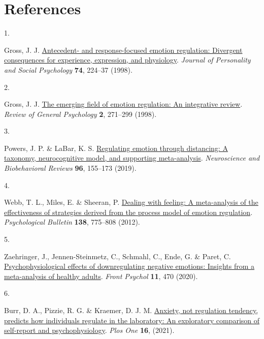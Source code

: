 \documentclass[
  man,floatsintext]{apa6}
\newlength{\cslhangindent}
\newlength{\csllabelwidth}
\newlength{\cslentryspacingunit} %
\newenvironment{CSLReferences}[2] %
 {%
  \setlength{\parindent}{0pt}
  \ifodd #1
  \let\oldpar\par
  \def\par{\hangindent=\cslhangindent\oldpar}
  \fi
  \setlength{\parskip}{#2\cslentryspacingunit}
 }%
 {}
\newcommand{\CSLLeftMargin}[1]{\parbox[t]{\csllabelwidth}{#1}}
\newcommand{\CSLRightInline}[1]{\parbox[t]{\linewidth - \csllabelwidth}{#1}\break}
\begin{document}
\hypertarget{references}{%
\section{References}\label{references}}

\begingroup
\setlength{\parindent}{-0.5in}
\setlength{\leftskip}{0.5in}

\hypertarget{refs}{}
\begin{CSLReferences}{0}{0}
\leavevmode{}%
\CSLLeftMargin{1. }%
\CSLRightInline{Gross, J. J. \href{https://doi.org/10.1037/0022-3514.74.1.224}{Antecedent- and response-focused emotion regulation: Divergent consequences for experience, expression, and physiology}. \emph{Journal of Personality and Social Psychology} \textbf{74}, 224--37 (1998).}

\leavevmode{}%
\CSLLeftMargin{2. }%
\CSLRightInline{Gross, J. J. \href{https://doi.org/10.1037/1089-2680.2.3.271}{The emerging field of emotion regulation: An integrative review}. \emph{Review of General Psychology} \textbf{2}, 271--299 (1998).}

\leavevmode{}%
\CSLLeftMargin{3. }%
\CSLRightInline{Powers, J. P. \& LaBar, K. S. \href{https://doi.org/10.1016/j.neubiorev.2018.04.023}{Regulating emotion through distancing: A taxonomy, neurocognitive model, and supporting meta-analysis}. \emph{Neuroscience and Biobehavioral Reviews} \textbf{96}, 155--173 (2019).}

\leavevmode{}%
\CSLLeftMargin{4. }%
\CSLRightInline{Webb, T. L., Miles, E. \& Sheeran, P. \href{https://doi.org/10.1037/a0027600}{Dealing with feeling: A meta-analysis of the effectiveness of strategies derived from the process model of emotion regulation}. \emph{Psychological Bulletin} \textbf{138}, 775--808 (2012).}

\leavevmode{}%
\CSLLeftMargin{5. }%
\CSLRightInline{Zaehringer, J., Jennen-Steinmetz, C., Schmahl, C., Ende, G. \& Paret, C. \href{https://doi.org/10.3389/fpsyg.2020.00470}{Psychophysiological effects of downregulating negative emotions: Insights from a meta-analysis of healthy adults}. \emph{Front Psychol} \textbf{11}, 470 (2020).}

\leavevmode{}%
\CSLLeftMargin{6. }%
\CSLRightInline{Burr, D. A., Pizzie, R. G. \& Kraemer, D. J. M. \href{https://doi.org/ARTN\%20e0247246\%0A10.1371/journal.pone.0247246}{Anxiety, not regulation tendency, predicts how individuals regulate in the laboratory: An exploratory comparison of self-report and psychophysiology}. \emph{Plos One} \textbf{16}, (2021).}


\end{CSLReferences}
\end{document}
